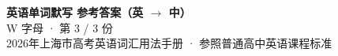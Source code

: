 \documentclass[10pt,a4paper]{article}
\begin{document}
\pagestyle{plain}

\begin{center}
{\LARGE\bfseries 英语单词默写 \quad 参考答案（英 $\to$ 中）}\\[0.22em]
{\large W 字母 · 第 3 / 3 份}\\[0.18em]
{\small 2026年上海市高考英语词汇用法手册 · 参照普通高中英语课程标准}
\end{center}

\vspace{0.2em}
\noindent{\color{rulegray}\rule{\textwidth}{0.8pt}}

\vspace{0.35em}

\vspace{0.25em}
\renewcommand{\arraystretch}{1.32}
\end{document}
